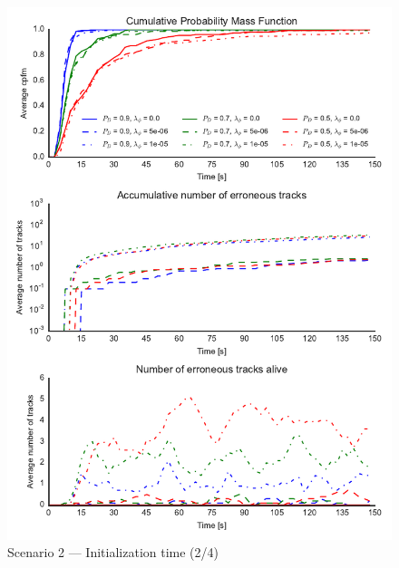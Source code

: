 \begin{figure}
\centering
\includegraphics{Figures/plots/Scenario2_Init-Time(2-4).pdf}
\caption{Scenario 2 --- Initialization time (2/4)}\label{fig:init2_time_2-4}
\end{figure}

